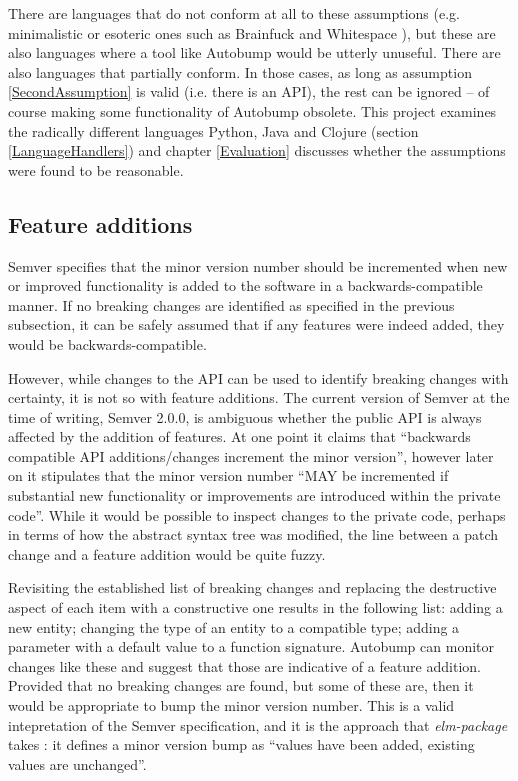 \documentclass{l4proj}
\begin{document}
There are languages that do not conform at all to these assumptions
(e.g. minimalistic or esoteric ones such as Brainfuck \cite{Brainfuck}
and Whitespace \cite{Whitespace}), but these are also languages where
a tool like Autobump would be utterly unuseful. There are also
languages that partially conform. In those cases, as long as
assumption \ref{SecondAssumption} is valid (i.e. there is an API), the
rest can be ignored -- of course making some functionality of Autobump
obsolete. This project examines the radically different languages
Python, Java and Clojure (section \ref{LanguageHandlers}) and chapter
\ref{Evaluation} discusses whether the assumptions were found to be
reasonable.

\subsection{Feature additions}

Semver specifies that the minor version number should be incremented
when new or improved functionality is added to the software in a
backwards-compatible manner. If no breaking changes are identified as
specified in the previous subsection, it can be safely assumed that if any
features were indeed added, they would be backwards-compatible.

However, while changes to the API can be used to identify breaking
changes with certainty, it is not so with feature additions. The
current version of Semver at the time of writing, Semver 2.0.0, is
ambiguous whether the public API is always affected by the addition of
features. At one point it claims that ``backwards compatible API
additions/changes increment the minor version'', however later on it
stipulates that the minor version number ``MAY be incremented if
substantial new functionality or improvements are introduced within
the private code''.
While it would be possible to inspect changes to the private code,
perhaps in terms of how the abstract syntax tree was modified, the
line between a patch change and a feature addition would be quite
fuzzy.

Revisiting the established list of breaking changes and replacing the
destructive aspect of each item with a constructive one results in the
following list: adding a new entity; changing the type of an entity to
a compatible type; adding a parameter with a default value to a
function signature. Autobump can monitor changes like these and
suggest that those are indicative of a feature addition. Provided that
no breaking changes are found, but some of these are, then it would be
appropriate to bump the minor version number. This is a valid
intepretation of the Semver specification, and it is the approach that
\textit{elm-package} takes \cite{ElmPackageVR}: it defines a minor
version bump as ``values have been added, existing values are
unchanged''.
\end{document}
